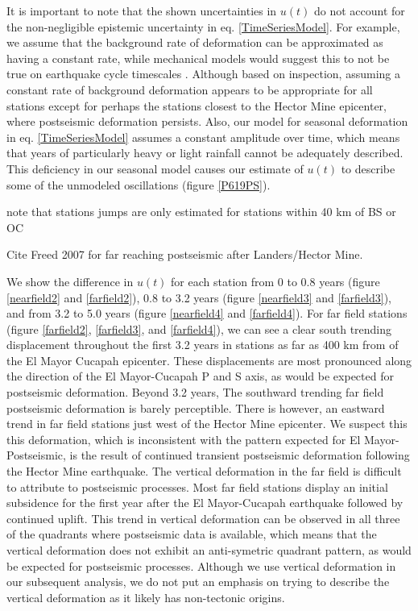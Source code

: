 \documentclass[12pt]{article}
\begin{document}
It is important to note that the shown uncertainties in $u(t)$ do not account for the non-negligible epistemic uncertainty in eq. \ref{TimeSeriesModel}.  For example, we assume that the background rate of deformation can be approximated as having a constant rate, while mechanical models would suggest this to not be true on earthquake cycle timescales \cite{Thatcher1983}. Although based on inspection,  assuming a constant rate of background deformation appears to be appropriate for all stations except for perhaps the stations closest to the Hector Mine epicenter, where postseismic deformation persists.  Also, our model for seasonal deformation in eq. \ref{TimeSeriesModel} assumes a constant amplitude over time, which means that years of particularly heavy or light rainfall cannot be adequately described.  This deficiency in our seasonal model causes our estimate of $u(t)$ to describe some of the unmodeled oscillations (figure \ref{P619PS}).          

note that stations jumps are only estimated for stations within 40 km of BS or OC



         


Cite Freed 2007 for far reaching postseismic after Landers/Hector Mine.



We show the difference in $u(t)$ for each station from 0 to 0.8 years (figure \ref{nearfield2} and \ref{farfield2}), 0.8 to 3.2 years (figure \ref{nearfield3} and \ref{farfield3}), and from 3.2 to 5.0 years (figure \ref{nearfield4} and \ref{farfield4}).  For far field stations (figure \ref{farfield2}, \ref{farfield3}, and \ref{farfield4}), we can see a clear south trending displacement throughout the first 3.2 years in stations as far as 400 km from of the El Mayor Cucapah epicenter.  These displacements are most pronounced along the direction of the El Mayor-Cucapah P and S axis, as would be expected for postseismic deformation.  Beyond 3.2 years, The southward trending far field postseismic deformation is barely perceptible. There is however, an eastward trend in far field stations just west of the Hector Mine epicenter.  We suspect this this deformation, which is inconsistent with the pattern expected for El Mayor-Postseismic, is the result of continued transient postseismic deformation following the Hector Mine earthquake.  The vertical deformation in the far field is difficult to attribute to postseismic processes.  Most far field stations display an initial subsidence for the first year after the El Mayor-Cucapah earthquake followed by continued uplift.  This trend in vertical deformation can be observed in all three of the quadrants where postseismic data is available, which means that the vertical deformation does not exhibit an anti-symetric quadrant pattern, as would be expected for postseismic processes.  Although we use vertical deformation in our subsequent analysis, we do not put an emphasis on trying to describe the vertical deformation as it likely has non-tectonic origins.        
\end{document}
